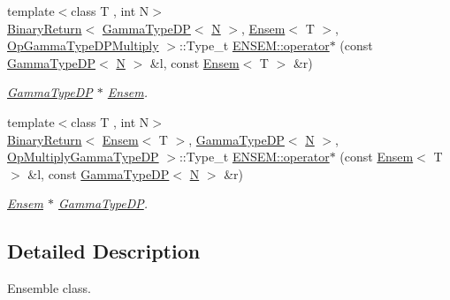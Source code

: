 \begin{DoxyCompactItemize}
{\footnotesize template$<$class T , int N$>$ }\\\mbox{\hyperlink{structENSEM_1_1BinaryReturn}{Binary\+Return}}$<$ \mbox{\hyperlink{classENSEM_1_1GammaTypeDP}{Gamma\+Type\+DP}}$<$ \mbox{\hyperlink{operator__name__util_8cc_a7722c8ecbb62d99aee7ce68b1752f337}{N}} $>$, \mbox{\hyperlink{classENSEM_1_1Ensem}{Ensem}}$<$ T $>$, \mbox{\hyperlink{structENSEM_1_1OpGammaTypeDPMultiply}{Op\+Gamma\+Type\+D\+P\+Multiply}} $>$\+::Type\+\_\+t \mbox{\hyperlink{group__eensem_ga53d61b0a5109e4f59f7b77a3fb4817f9}{E\+N\+S\+E\+M\+::operator$\ast$}} (const \mbox{\hyperlink{classENSEM_1_1GammaTypeDP}{Gamma\+Type\+DP}}$<$ \mbox{\hyperlink{operator__name__util_8cc_a7722c8ecbb62d99aee7ce68b1752f337}{N}} $>$ \&l, const \mbox{\hyperlink{classENSEM_1_1Ensem}{Ensem}}$<$ T $>$ \&r)
\begin{DoxyCompactList}\small\item\em \mbox{\hyperlink{classENSEM_1_1GammaTypeDP}{Gamma\+Type\+DP}} $\ast$ \mbox{\hyperlink{classENSEM_1_1Ensem}{Ensem}}. \end{DoxyCompactList}\item 
{\footnotesize template$<$class T , int N$>$ }\\\mbox{\hyperlink{structENSEM_1_1BinaryReturn}{Binary\+Return}}$<$ \mbox{\hyperlink{classENSEM_1_1Ensem}{Ensem}}$<$ T $>$, \mbox{\hyperlink{classENSEM_1_1GammaTypeDP}{Gamma\+Type\+DP}}$<$ \mbox{\hyperlink{operator__name__util_8cc_a7722c8ecbb62d99aee7ce68b1752f337}{N}} $>$, \mbox{\hyperlink{structENSEM_1_1OpMultiplyGammaTypeDP}{Op\+Multiply\+Gamma\+Type\+DP}} $>$\+::Type\+\_\+t \mbox{\hyperlink{group__eensem_ga28d880d590e554a96424952e16186000}{E\+N\+S\+E\+M\+::operator$\ast$}} (const \mbox{\hyperlink{classENSEM_1_1Ensem}{Ensem}}$<$ T $>$ \&l, const \mbox{\hyperlink{classENSEM_1_1GammaTypeDP}{Gamma\+Type\+DP}}$<$ \mbox{\hyperlink{operator__name__util_8cc_a7722c8ecbb62d99aee7ce68b1752f337}{N}} $>$ \&r)
\begin{DoxyCompactList}\small\item\em \mbox{\hyperlink{classENSEM_1_1Ensem}{Ensem}} $\ast$ \mbox{\hyperlink{classENSEM_1_1GammaTypeDP}{Gamma\+Type\+DP}}. \end{DoxyCompactList}\end{DoxyCompactItemize}


\subsection{Detailed Description}
Ensemble class. 



